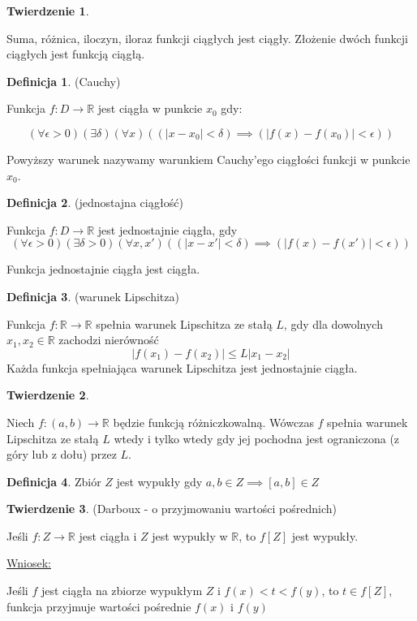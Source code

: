 \documentclass{article}
\theoremstyle{definition}
\newtheorem{de}{Definicja}[subsection]
\theoremstyle{definition}
\newtheorem{tw}{Twierdzenie}[subsection]
\theoremstyle{definition}
\begin{document}
\begin{tw}
\

Suma, różnica, iloczyn, iloraz funkcji ciągłych jest ciągły.
Złożenie dwóch funkcji ciągłych jest funkcją ciągłą.
\end{tw}

\begin{de}
(Cauchy)

Funkcja $ f: D \to \mathbb{R} $ jest ciągła w punkcie $ x_0 $ gdy:

$$
(\forall \epsilon > 0)(\exists \delta)(\forall x)((|x-x_0|<\delta) \implies (|f(x)-f(x_0)|<\epsilon))
$$

Powyższy warunek nazywamy warunkiem Cauchy'ego ciągłości funkcji w punkcie $x_0$.
\end{de}

\begin{de}
(jednostajna ciągłość)

Funkcja $ f: D \to \mathbb{R} $ jest jednostajnie ciągła, gdy 
$$
(\forall \epsilon > 0)(\exists \delta > 0)(\forall x,x')((|x-x'|<\delta) \implies
(|f(x)-f(x')| < \epsilon))
$$

Funkcja jednostajnie ciągła jest ciągła.
\end{de}

\begin{de}
(warunek Lipschitza)

Funkcja $ f:\mathbb{R} \to \mathbb{R} $ spełnia warunek Lipschitza ze stałą $L$,
gdy dla dowolnych $x_1, x_2 \in \mathbb{R}$ zachodzi nierówność
$$
|f(x_1)-f(x_2)| \leq L|x_1-x_2|
$$
Każda funkcja spełniająca warunek Lipschitza jest jednostajnie ciągła.
\end{de}

\begin{tw}
\

Niech $f:(a,b) \to \mathbb{R}$ będzie funkcją różniczkowalną. Wówczas $f$
spełnia warunek Lipschitza ze stałą $L$ wtedy i tylko wtedy gdy jej pochodna
jest ograniczona (z góry lub z dołu) przez $L$.
\end{tw}

\begin{de}
Zbiór $Z$ jest wypukły gdy $a,b \in Z \implies [a,b] \in Z$
\end{de}

\begin{tw}
(Darboux - o przyjmowaniu wartości pośrednich)

Jeśli $f: Z \to \mathbb{R}$ jest ciągła i $Z$ jest wypukły w $\mathbb{R}$, to $f[Z]$ jest wypukły.

\underline{Wniosek:}

Jeśli $f$ jest ciągła na zbiorze wypukłym $Z$ i $ f(x)<t<f(y) $, to $ t \in f[Z] $, 
funkcja przyjmuje wartości pośrednie $f(x)$ i $f(y)$
\end{tw}
\end{document}
